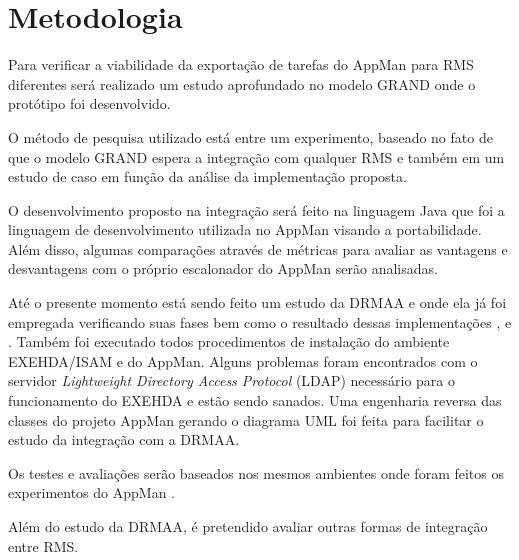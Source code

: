 \section{Metodologia}
\label{cap:metodologia}

Para verificar a viabilidade da exportação de tarefas do AppMan para RMS diferentes será realizado um estudo aprofundado no modelo GRAND onde o protótipo foi desenvolvido.

O método de pesquisa utilizado está entre um experimento, baseado no fato de que o modelo GRAND espera a integração com qualquer RMS e também em um estudo de caso em função da análise da implementação proposta.

O desenvolvimento proposto na integração será feito na linguagem Java que foi a linguagem de desenvolvimento utilizada no AppMan visando a portabilidade. Além disso, algumas comparações através de métricas para avaliar as vantagens e desvantagens com o próprio escalonador do AppMan serão analisadas.

Até o presente momento está sendo feito um estudo da DRMAA e onde ela já foi empregada verificando suas fases bem como o resultado dessas implementações \cite{Templeton}, \cite{Llorente2005} e \cite{Haas2004}. Também foi executado todos procedimentos de instalação do ambiente EXEHDA/ISAM e do AppMan. Alguns problemas foram encontrados com o servidor \emph{ Lightweight Directory Access Protocol} (LDAP) necessário para o funcionamento do EXEHDA e estão sendo sanados. Uma engenharia reversa das classes do projeto AppMan gerando o diagrama UML foi feita para facilitar o estudo da integração com a DRMAA.

Os testes e avaliações serão baseados nos mesmos ambientes onde foram feitos os experimentos do AppMan \cite{Mangan2006}. 

Além do estudo da DRMAA, é pretendido avaliar outras formas de integração entre RMS.
